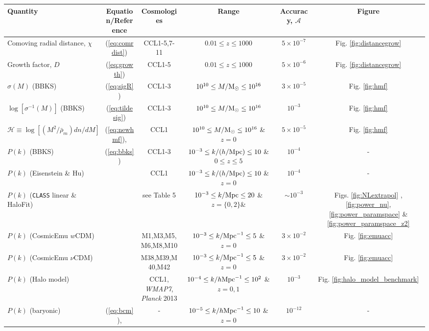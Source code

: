 
%
\begin{sidewaystable*}[!htp]
  \centering
  \begin{tabular}{ l|c c c c c}
    \hline
    Quantity & Equation/Reference & Cosmologies & Range & Accuracy, $\mathcal{A}$ & Figure \\
    \hline
    Comoving radial distance, $\chi$ & (\ref{eq:comrdist}) & CCL1-5,7-11 & $0.01 \leq z\leq 1000$ &  $5\times 10^{-7}$ & Fig. \ref{fig:distancegrow}\\
    Growth factor, $D$ & (\ref{eq:growth}) & CCL1-5 &  $0.01 \leq z\leq 1000 $ &  $5\times 10^{-6}$ & Fig. \ref{fig:distancegrow}\\
    $\sigma(M)$ (BBKS) & (\ref{eq:sigR}) & CCL1-3 &  $10^{10}\leq M/{\rm M}_\odot\leq 10^{16}$ &  $3\times 10^{-5}$ & Fig. \ref{fig:hmf}\\
    $\log[\sigma^{-1}(M)]$ (BBKS) & (\ref{eq:tildesig}) & CCL1-3 &  $10^{10}\leq M/{\rm M}_\odot\leq 10^{16}$ &  $10^{-3}$ & Fig. \ref{fig:hmf}\\
    $\mathcal H \equiv \log[(M^2/\bar{\rho}_m)dn/dM]$  & (\ref{eq:newhmf}), \citet{Tinker2010} & CCL1 & $10^{10}\leq M/{\rm M}_\odot\leq 10^{16}$ \& $z=0$ & $5\times 10^{-5}$ & Fig. \ref{fig:hmf}\\
    $P(k)$ (BBKS) & (\ref{eq:bbks}) & CCL1-3 & $10^{-3}\leq k/(h/{\rm Mpc})\leq 10$ \& $0\leq z\leq 5$ &  $10^{-4}$ & -\\
    $P(k)$ (Eisenstein \& Hu) & \citet{1998ApJ...496..605E}  & CCL1 & $10^{-3}\leq k/(h/{\rm Mpc})\leq 10$ \& $z=0$ & $10^{-4}$ & -\\
    $P(k)$ ({\tt CLASS} linear \& HaloFit) & \citet{CLASS_halofit}  & see Table 5 & $10^{-3}\leq k/{\rm Mpc}\leq 20$ \& $z=\{0,2\}$\&  & $\sim 10^{-3}$ & Figs. \ref{fig:NLextrapol} , \ref{fig:power_nu}, \ref{fig:power_paramspace} \& \ref{fig:power_paramspace_z2} \\
    $P(k)$ (CosmicEmu $w$CDM) & \citet{Lawrence17} & M1,M3,M5,M6,M8,M10 & $10^{-3}\leq k/{\rm Mpc}^{-1}\leq 5$ \& $z=0$  & $3\times 10^{-2}$ & Fig. \ref{fig:emuacc}\\
    $P(k)$ (CosmicEmu $\nu$CDM) & \citet{Lawrence17} & M38,M39,M40,M42 & $10^{-3}\leq k/{\rm Mpc}^{-1}\leq 5$ \& $z=0$ & $3\times 10^{-2}$ & Fig. \ref{fig:emuacc}\\
    $P(k)$ (Halo model) & \citet{Cooray2002} & CCL1, {\it WMAP7}, {\it Planck} 2013 & $10^{-4}\leq k/h{\rm Mpc}^{-1}\leq 10^{2}$ \& $z=0,1$ & $10^{-3}$ & Fig. \ref{fig:halo_model_benchmark}\\
    $P(k)$ (baryonic) & (\ref{eq:bcm}), \citet{Schneider15} &  - & $10^{-5}\leq k/h{\rm Mpc}^{-1}\leq 10$ \& $z=0$ & $10^{-12}$ & -\\

\end{tabular}
\end{sidewaystable*}
